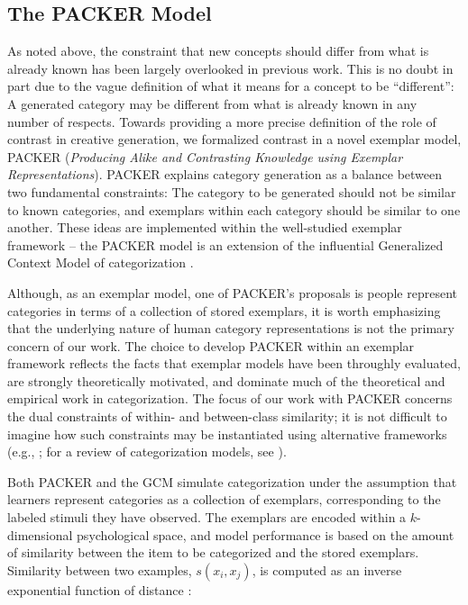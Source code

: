 \documentclass[12pt]{article}
\begin{document}
\begin{flushleft}
\subsection{The PACKER Model}

\label{section:PACKER-definition}

As noted above, the constraint that new concepts should differ from what is already known has been largely overlooked in previous work. This is no doubt in part due to the vague definition of what it means for a concept to be ``different'': A generated category may be different from what is already known in any number of respects. Towards providing a more precise definition of the role of contrast in creative generation, we formalized contrast in a novel exemplar model, PACKER  ({\em Producing Alike and Contrasting Knowledge using Exemplar Representations}). PACKER explains category generation as a balance between two fundamental constraints: The category to be generated should not be similar to known categories, and exemplars within each category should be similar to one another. These ideas are implemented within the well-studied exemplar framework -- the PACKER model is an extension of the influential Generalized Context Model of categorization \citep[GCM;][]{nosofsky1984choice,nosofsky1986attention}. 

Although, as an exemplar model, one of PACKER's proposals is people represent categories in terms of a collection of stored exemplars, it is worth emphasizing that the underlying nature of human category representations is not the primary concern of our work. The choice to develop PACKER within an exemplar framework reflects the facts that exemplar models have been throughly evaluated, are strongly theoretically motivated, and dominate much of the theoretical and empirical work in categorization. The focus of our work with PACKER concerns the dual constraints of within- and between-class similarity; it is not difficult to imagine how such constraints may be instantiated using alternative frameworks (e.g., \citealp{kurtz2007divergent,love2004sustain,smith2000thirty}; for a review of categorization models, see \citealp{pothoswills2011}).

Both PACKER and the GCM simulate categorization under the assumption that learners represent categories as a collection of exemplars, corresponding to the labeled stimuli they have observed. The exemplars are encoded within a $k$-dimensional psychological space, and model performance is based on the amount of similarity between the item to be categorized and the stored exemplars. Similarity between two examples, $s\left(x_i, x_j\right)$, is computed as an inverse exponential function of distance \citep[following][]{attneave1950,shepard1957stimulus,shepard1987toward}:


\end{flushleft}
\end{document}
